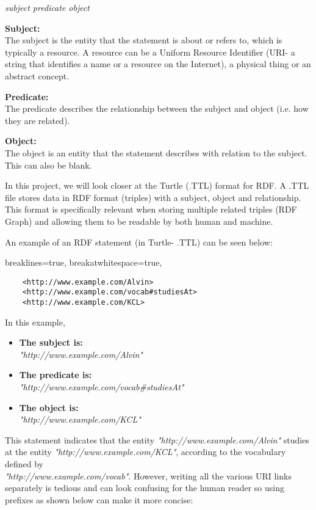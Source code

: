 \begin{center}
   \textit{subject predicate object}
\end{center} 

\textbf{Subject:} \\
The subject is the entity that the statement is about or refers to, which is typically a resource. A resource can be a Uniform Resource Identifier (URI- a string that identifies a name or a resource on the Internet), a physical thing or an abstract concept. 

\textbf{Predicate:} \\
The predicate describes the relationship between the subject and object (i.e. how they are related). 

\textbf{Object:} \\
The object is an entity that the statement describes with relation to the subject. This can also be blank. 

In this project, we will look closer at the Turtle (.TTL) format for RDF. A .TTL file stores data in RDF format (triples) with a subject, object and relationship. This format is specifically relevant when storing multiple related triples (RDF Graph) and allowing them to be readable by both human and machine. \cite{TTL}

An example of an RDF statement (in Turtle- .TTL) can be seen below:

\lstset
{
    breaklines=true,
    breakatwhitespace=true,
}
\begin{center}
\begin{lstlisting}
    <http://www.example.com/Alvin> 
    <http://www.example.com/vocab#studiesAt> 
    <http://www.example.com/KCL>
\end{lstlisting}
\end{center} 

\noindent In this example, 
\begin{itemize}
    \itemsep0em 
\item \textbf{The subject is:} \\ \textit{"http://www.example.com/Alvin"}
\item \textbf{The predicate is:} \\ \textit{"http://www.example.com/vocab\#studiesAt"}
\item \textbf{The object is:} \\ \textit{"http://www.example.com/KCL"}
\end{itemize}

This statement indicates that the entity \textit{"http://www.example.com/Alvin"} studies at the entity \textit{"http://www.example.com/KCL"}, according to the vocabulary defined by \\\textit{"http://www.example.com/vocab"}. However, writing all the various URI links separately is tedious and can look confusing for the human reader so using prefixes as shown below can make it more concise:

